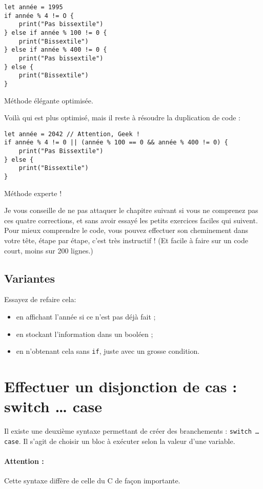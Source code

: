 \begin{listing}[h!]
\begin{verbatim}
let année = 1995
if année % 4 != O {
    print("Pas bissextile")
} else if année % 100 != 0 {
    print("Bissextile")
} else if année % 400 != 0 {
    print("Pas bissextile")
} else {
    print("Bissextile")
}
\end{verbatim}
\caption{Méthode élégante optimisée.}
\end{listing}
Voilà qui est plus optimisé, mais il reste à résoudre la duplication de code :

\begin{listing}[h!]
\begin{verbatim}
let année = 2042 // Attention, Geek !
if année % 4 != 0 || (année % 100 == 0 && année % 400 != 0) {
    print("Pas Bissextile")
} else {
    print("Bissextile")
}
\end{verbatim}
\caption{Méthode experte !}
\end{listing}

Je vous conseille de ne pas attaquer le chapitre suivant
si vous ne comprenez pas ces quatre corrections,
et sans avoir essayé les petits exercices faciles qui suivent. Pour mieux comprendre le code, vous pouvez effectuer son cheminement dans votre tête, étape par étape, c’est très instructif ! (Et facile à faire sur un code court, moins sur 200 lignes.)
\subsection{Variantes}
Essayez de refaire cela:
\begin{itemize}

\item en affichant l'année si ce n'est pas déjà fait ;
\item en stockant l'information dans un booléen ;
\item en n'obtenant cela sans \texttt{if}, juste avec un grosse condition.

\end{itemize}
\section{Effectuer un disjonction de cas : switch … case}
Il existe une deuxième syntaxe permettant de créer des branchements :
\texttt{switch … case}.
Il s'agit de choisir un bloc à exécuter selon la valeur d'une variable.
\paragraph{Attention :}Cette syntaxe diffère de celle du C de façon importante.


